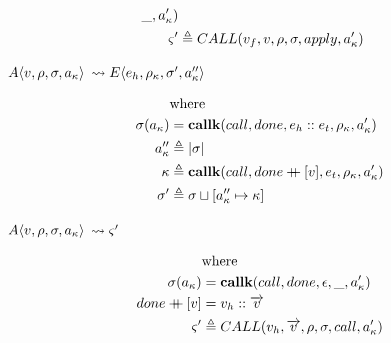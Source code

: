\documentclass[12pt,draft]{article}
\newcommand\mdoubleplus{\ensuremath{\mathbin{+\mkern-9mu+}}}
\newcommand{\E}[4]{E\langle #1 , #2 , #3 , #4 \rangle}
\newcommand{\A}[4]{A\langle #1 , #2 , #3 , #4 \rangle}
\begin{document}
\begin{multicols*}{2}
\begin{align*}
                       \_ , a_{\kappa}') \\
    \varsigma' &\triangleq CALL(v_f , v , \rho , \sigma , apply , a_{\kappa}')
  \end{align*}
  \begin{center}
    $\A{v}{\cenv}{\cstore}{\ckaddr}$
    $\leadsto \E{e_h}{\cenv_{\kappa}}{\cstore'}{\ckaddr''}$
  \end{center}
  \vspace{-7mm}
  \begin{align*}
    &\text{where} \\
    \cstore(\ckaddr) &= \textbf{callk}(call, done , e_h::e_t ,
                       \cenv_{\ckont} , \ckaddr') \\
    \ckaddr'' &\triangleq |\cstore| \\
    \ckont &\triangleq \textbf{callk}(call, done \mdoubleplus [v] ,
             e_t , \cenv_{\ckont} , \ckaddr') \\
    \cstore' &\triangleq \cstore \sqcup [\ckaddr'' \mapsto \ckont]
  \end{align*}
  \begin{center}
    $\A{v}{\cenv}{\cstore}{\ckaddr}$
    $\leadsto \varsigma' $
  \end{center}
  \vspace{-7mm}
  \begin{align*}
    &\text{where} \\
    \cstore(\ckaddr) &= \textbf{callk}(call, done ,
                       \epsilon , \_ , \ckaddr') \\
    done \mdoubleplus [v] &= v_h :: \overrightarrow{v} \\
    \cstate' &\triangleq CALL(v_h , \overrightarrow{v} ,
               \cenv , \cstore , call , \ckaddr') \\
  \end{align*}
\end{multicols*}


\newpage
\end{document}

